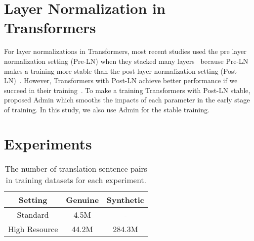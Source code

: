 \documentclass[11pt]{article}
\begin{document}
\section{Layer Normalization in Transformers}
For layer normalizations in Transformers, most recent studies used the pre layer normalization setting (Pre-LN) when they stacked many layers~\cite{wang-etal-2019-learning,NEURIPS2020_1457c0d6} because Pre-LN makes a training more stable than the post layer normalization setting (Post-LN)~\cite{iwslt-2019-transformer,layer-normalization-icml2020}.
However, Transformers with Post-LN achieve better performance if we succeed in their training~\cite{iwslt-2019-transformer,liu-etal-2020-understanding}.
To make a training Transformers with Post-LN stable,  proposed Admin which smooths the impacts of each parameter in the early stage of training.
In this study, we also use Admin for the stable training.


\section{Experiments}
\begin{table}[!t]
  \centering
\begin{tabular}{ c | c | c } \hline
  Setting & Genuine & Synthetic \\ \hline
  Standard & 4.5M & - \\
  High Resource & 44.2M & 284.3M \\ \hline
  \end{tabular}
  \caption{The number of translation sentence pairs in training datasets for each experiment.}
  \label{table:mt_dataset}
\end{table}
\end{document}
